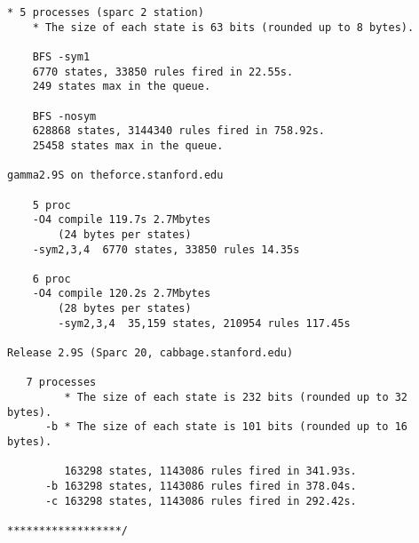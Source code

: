 \documentclass[11pt]{article}
\begin{document}
\begin{tiny}
\begin{verbatim}
* 5 processes (sparc 2 station)
	* The size of each state is 63 bits (rounded up to 8 bytes).

	BFS -sym1
	6770 states, 33850 rules fired in 22.55s.
	249 states max in the queue.

	BFS -nosym
	628868 states, 3144340 rules fired in 758.92s.
	25458 states max in the queue.

gamma2.9S on theforce.stanford.edu 

  	5 proc
	-O4 compile 119.7s 2.7Mbytes
	    (24 bytes per states)
	-sym2,3,4  6770 states, 33850 rules 14.35s

	6 proc
	-O4 compile 120.2s 2.7Mbytes
	    (28 bytes per states)
        -sym2,3,4  35,159 states, 210954 rules 117.45s 

Release 2.9S (Sparc 20, cabbage.stanford.edu)

   7 processes
         * The size of each state is 232 bits (rounded up to 32 bytes).
      -b * The size of each state is 101 bits (rounded up to 16 bytes).

         163298 states, 1143086 rules fired in 341.93s.
      -b 163298 states, 1143086 rules fired in 378.04s.
      -c 163298 states, 1143086 rules fired in 292.42s.

******************/
  \end{verbatim}
\end{tiny}
  
\end{document}
